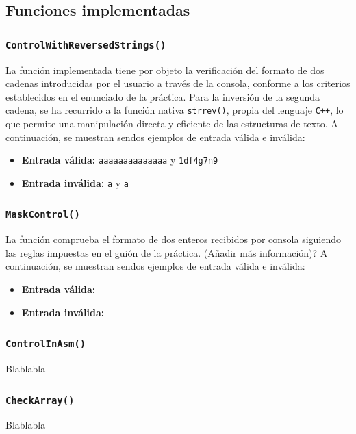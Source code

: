 \documentclass[11pt,a4paper]{article}
\begin{document}
\subsection{Funciones implementadas}
\subsubsection{\texttt{ControlWithReversedStrings()}}
La función implementada tiene por objeto la verificación del formato de dos cadenas introducidas por el usuario a través de la consola, conforme a los criterios establecidos en el enunciado de la práctica. Para la inversión de la segunda cadena, se ha recurrido a la función nativa \texttt{strrev()}, propia del lenguaje \texttt{C++}, lo que permite una manipulación directa y eficiente de las estructuras de texto. A continuación, se muestran sendos ejemplos de entrada válida e inválida:
\begin{itemize}
  \item \textbf{Entrada válida:} \texttt{aaaaaaaaaaaaaa} y \texttt{1df4g7n9}
  \item \textbf{Entrada inválida:} \texttt{a} y \texttt{a}
\end{itemize}

\vspace{3ex}

\subsubsection{\texttt{MaskControl()}}
La función comprueba el formato de dos enteros recibidos por consola siguiendo las reglas impuestas en el guión de la práctica. (Añadir más información)? A continuación, se muestran sendos ejemplos de entrada válida e inválida:
\begin{itemize}
  \item \textbf{Entrada válida:} 
  \item \textbf{Entrada inválida:}
\end{itemize}

\vspace{3ex}

\subsubsection{\texttt{ControlInAsm()}}
Blablabla

\vspace{3ex}

\subsubsection{\texttt{CheckArray()}}
Blablabla
\end{document}
